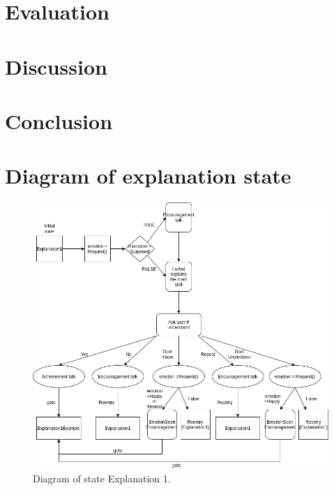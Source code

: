 \documentclass[sigconf, nonacm]{acmart}
\begin{document}
\section{Evaluation}


\section{Discussion}


\section{Conclusion}


\begin{acks}
\end{acks}






\onecolumn
\appendix
\section{Diagram of explanation state}
\label{appendix:a}
\begin{figure}[H]
\centering
\includegraphics[width=\linewidth]{images/StateDiagram.png}
\caption{Diagram of state Explanation 1.}
\label{fig:State}
\end{figure}
\end{document}
